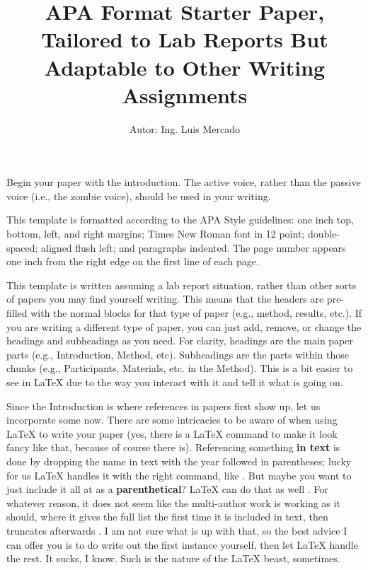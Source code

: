 \documentclass[stu,12pt,floatsintext,justification]{apa7_ula}
\title{APA Format Starter Paper, Tailored to Lab Reports But Adaptable to Other
    Writing Assignments} %
\author{Autor: Ing. Luis Mercado}
\affiliation{Universidad de los Andes}
\begin{document}
\maketitle %


Begin your paper with the introduction. The active voice, rather than the
passive voice (i.e., the zombie voice), should be used in your writing.

This template is formatted according to the APA Style guidelines: one inch top,
bottom, left, and right margins; Times New Roman font in 12 point;
double-spaced; aligned flush left; and paragraphs indented. The page number
appears one inch from the right edge on the first line of each page.

This template is written assuming a lab report situation, rather than other
sorts of papers you may find yourself writing. This means that the headers are
pre-filled with the normal blocks for that type of paper (e.g., method,
results, etc.). If you are writing a different type of paper, you can just add,
remove, or change the headings and subheadings as you need. For clarity,
headings are the main paper parts (e.g., Introduction, Method, etc).
Subheadings are the parts within those chunks (e.g., Participants, Materials,
etc. in the Method). This is a bit easier to see in \LaTeX{} due to the way you
interact with it and tell it what is going on.

Since the Introduction is where references in papers first show up, let us
incorporate some now. There are some intricacies to be aware of when using
\LaTeX{} to write your paper (yes, there is a \LaTeX{} command to make it look
fancy like that, because of course there is). Referencing something \textbf{in
    text} is done by dropping the name in text with the year followed in
parentheses; lucky for us \LaTeX{} handles it with the right command, like
\textcite{Sample2024}. But maybe you want to just include it all at as a
\textbf{parenthetical}? \LaTeX{} can do that as well \parencite{FullBook2021}.
For whatever reason, it does not seem like the multi-author work
\parencite[e.g.,][]{Multiauthor2020} is working as it should, where it gives
the full list the first time it is included in text, then truncates afterwards
\parencite{Multiauthor2020}. I am not sure what is up with that, so the best
advice I can offer you is to do write out the first instance yourself, then let
\LaTeX{} handle the rest. It sucks, I know. Such is the nature of the \LaTeX{}
beast, sometimes.
\end{document}
